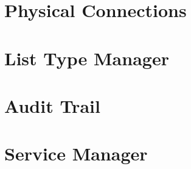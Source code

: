 \documentclass[a4paper]{article}
\begin{document}
	\newpage
	\section{Physical Connections} \label{sec:physical_connections}
	
	\newpage
	\section{List Type Manager} \label{sec:list_type_manager}
	
	\newpage
	\section{Audit Trail} \label{sec:audit_trail}
	
	\newpage
	\section{Service Manager} \label{sec:service_manager}
\end{document}
